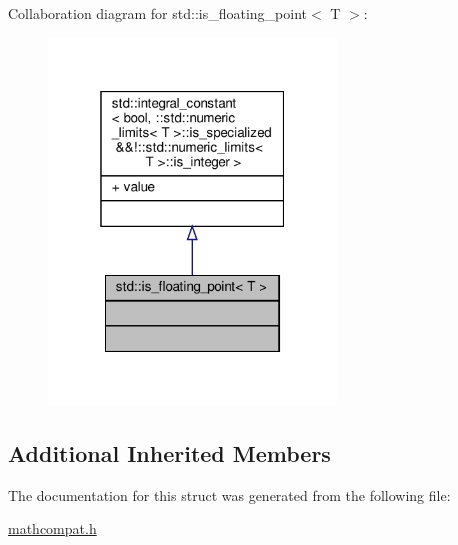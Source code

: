 Collaboration diagram for std\+:\+:is\+\_\+floating\+\_\+point$<$ T $>$\+:\nopagebreak
\begin{figure}[H]
\begin{center}
\leavevmode
\includegraphics[width=217pt]{de/df6/structstd_1_1is__floating__point__coll__graph}
\end{center}
\end{figure}
\subsection*{Additional Inherited Members}


The documentation for this struct was generated from the following file\+:\begin{DoxyCompactItemize}
\item 
\hyperlink{mathcompat_8h}{mathcompat.\+h}\end{DoxyCompactItemize}
